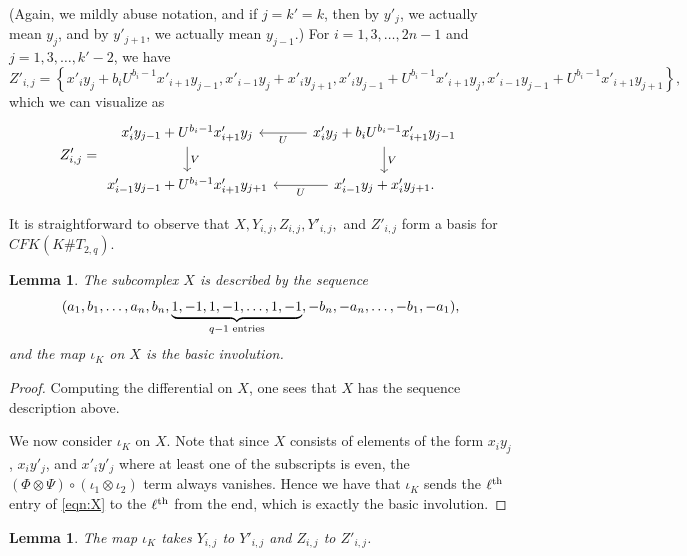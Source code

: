 \documentclass[11pt, reqno]{amsart}
\newtheorem{lemma}[theorem]{Lemma}
\theoremstyle{definition}
\theoremstyle{remark}
\def\CFK{\mathit{CFK}}
\numberwithin{equation}{section}
\begin{document}
(Again, we mildly abuse notation, and if $j=k'=k$, then by $y'_j$, we actually mean $y_j$, and by $y'_{j+1}$, we actually mean $y_{j-1}$.)
For $i=1, 3, \dots, 2n-1$ and $j=1, 3, \dots, k'-2$, we have
\[ Z'_{i, j} = \left\{ x'_i y_j +  b_i U^{b_i-1}x'_{i+1} y_{j-1}, x'_{i-1}y_{j}+x'_i y_{j+1}, x'_{i} y_{j-1} + U^{b_i-1}x'_{i+1}y_{j}, x'_{i-1}y_{j-1}+U^{b_i-1}x'_{i+1} y_{j+1}  \right\}, \]
which we can visualize as
\[
Z'_{i,j} = \begin{tikzcd}
	   x'_i y_{j-1} + U^{b_i-1}x'_{i+1}y_{j} \ar[d, "V"] & x'_i y_j +  b_i U^{b_i-1}x'_{i+1} y_{j-1} \ar[l, "U"] \ar[d, "V"]  \\
	 x'_{i-1}y_{j-1}+U^{b_i-1}x'_{i+1} y_{j+1} & x'_{i-1}y_{j}+x'_i y_{j+1}. \ar[l, "U"] 
\end{tikzcd}
\]

It is straightforward to observe that $X, Y_{i,j}, Z_{i,j}, Y'_{i,j},$ and $Z'_{i,j}$ form a basis for $\CFK(K \# T_{2,q})$.

\begin{lemma}\label{lem:X}
The subcomplex $X$ is described by the sequence 
\[ (a_1, b_1, \dots, a_n, b_n, \underbrace{1, -1, 1, -1, \dots, 1, -1}_{q-1\textup{ entries}}, -b_n, -a_n, \dots, -b_1, -a_1),\]
and the map $\iota_K$ on $X$ is the basic involution.
\end{lemma}

\begin{proof}
Computing the differential on $X$, one sees that $X$ has the sequence description above.

We now consider $\iota_K$ on $X$. Note that since $X$ consists of elements of the form $x_i y_j$, $x_i y'_j$, and $x'_i y'_j$ where at least one of the subscripts is even, the $(\Phi \otimes \Psi) \circ (\iota_1 \otimes \iota_2)$ term always vanishes. Hence we have that $\iota_K$ sends the $\ell^\textup{th}$ entry of \eqref{eqn:X} to the $\ell^{\textup{th}}$ from the end, which is exactly the basic involution.
\end{proof}

\begin{lemma}\label{lem:YZ}
The map $\iota_K$ takes $Y_{i,j}$ to $Y'_{i,j}$ and $Z_{i,j}$ to $Z'_{i,j}$.
\end{lemma}
\end{document}
